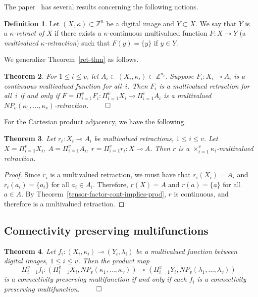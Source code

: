 \documentclass{article}
\theoremstyle{plain}
\newtheorem{thm}{Theorem}
\theoremstyle{definition}
\newtheorem{definition}[thm]{Definition}
\numberwithin{thm}{section}
\def\Z{{\mathbb Z}}
\begin{document}
The paper~\cite{egs08} has several
results concerning the following notions.

\begin{definition}
\rm{\cite{egs08}}
Let $(X,\kappa) \subset \Z^n$ be a digital image
and $Y \subset X$. We say that $Y$ is
a {\em $\kappa$-retract of $X$} if there exists a $\kappa$-continuous multivalued
function $F: X \multimap Y$ (a 
{\em multivalued $\kappa$-retraction}) such that
$F(y) = \{y\}$ if $y \in Y$.
\end{definition}

We generalize Theorem~\ref{ret-thm} as follows.

\begin{thm}
\label{multi-ret-thm}
\rm{\cite{Boxer16a}}
For $1 \leq i \leq v$, let $A_i \subset (X_i,\kappa_i) \subset \Z^{n_i}$.
Suppose $F_i: X_i \multimap A_i$ is a continuous multivalued function for all~$i$. Then $F_i$ is a multivalued retraction for all~$i$ if and only if
$F=\Pi_{i=1}^v F_i: \Pi_{i=1}^v X_i \multimap \Pi_{i=1}^v A_i$ is a multivalued
$NP_v(\kappa_1,\ldots,\kappa_v)$-retraction. $\qed$
\end{thm}

For the Cartesian product adjacency, we 
have the following.

\begin{thm}
\label{multi-retract-prod-Cart}
Let $r_i: X_i \multimap A_i$ be multivalued retractions, $1 \le i \le v$.
Let $X=\Pi_{i=1}^v X_i$, $A=\Pi_{i=1}^v A_i$, $r = \Pi_{i=1}^v r_i: X \multimap A$.
Then $r$ is a $\times_{i=1}^v \kappa_i$-multivalued retraction.
\end{thm}

\begin{proof}
Since $r_i$ is a multivalued retraction, we must have
that $r_i(X_i)=A_i$ and $r_i(a_i)=\{a_i\}$ for all $a_i \in A_i$. Therefore,
$r(X)=A$ and $r(a)=\{a\}$ for all $a \in A$. By Theorem~\ref{tensor-factor-cont-implies-prod}, $r$ is continuous, and 
therefore is a multivalued retraction. 
\end{proof}

\subsection{Connectivity preserving multifunctions}
\begin{thm}
\label{normal-conn-preserv}
\rm{\cite{Boxer16a}}
Let $f_i: (X_i, \kappa_i) \multimap (Y_i, \lambda_i)$ be
a multivalued function between digital images,
$1 \leq i \leq v$. Then the product map
\[ \Pi_{i=1}^v f_i : (\Pi_{i=1}^v X_i, NP_v(\kappa_1, \ldots, \kappa_v)) \multimap (\Pi_{i=1}^v Y_i, NP_v(\lambda_1, \ldots, \lambda_v))
\]
is a connectivity preserving multifunction if and
only if each $f_i$
is a connectivity preserving multifunction. $\qed$
\end{thm}
\end{document}
